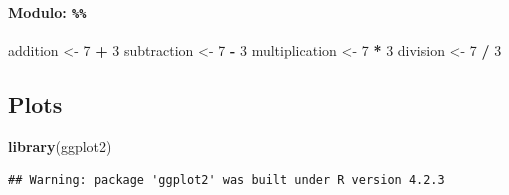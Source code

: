\documentclass[
]{article}
\newenvironment{Shaded}{\begin{snugshade}}{\end{snugshade}}
\newcommand{\CommentTok}[1]{\textcolor[rgb]{0.56,0.35,0.01}{\textit{#1}}}
\newcommand{\DataTypeTok}[1]{\textcolor[rgb]{0.13,0.29,0.53}{#1}}
\newcommand{\DecValTok}[1]{\textcolor[rgb]{0.00,0.00,0.81}{#1}}
\newcommand{\KeywordTok}[1]{\textcolor[rgb]{0.13,0.29,0.53}{\textbf{#1}}}
\newcommand{\NormalTok}[1]{#1}
\newcommand{\OperatorTok}[1]{\textcolor[rgb]{0.81,0.36,0.00}{\textbf{#1}}}
\newcommand{\StringTok}[1]{\textcolor[rgb]{0.31,0.60,0.02}{#1}}
\let\oldparagraph\paragraph
\renewcommand{\paragraph}[1]{\oldparagraph{#1}\mbox{}}
\begin{document}
\hypertarget{modulo}{%
\paragraph{\texorpdfstring{\textbf{Modulo}:
\texttt{\%\%}}{Modulo: \%\%}}\label{modulo}}

\begin{Shaded}
\begin{Highlighting}[]
\NormalTok{addition <-}\StringTok{ }\DecValTok{7} \OperatorTok{+}\StringTok{ }\DecValTok{3}
\NormalTok{subtraction <-}\StringTok{ }\DecValTok{7} \OperatorTok{-}\StringTok{ }\DecValTok{3}
\NormalTok{multiplication <-}\StringTok{ }\DecValTok{7} \OperatorTok{*}\StringTok{ }\DecValTok{3}
\NormalTok{division <-}\StringTok{ }\DecValTok{7} \OperatorTok{/}\StringTok{ }\DecValTok{3}
\end{Highlighting}
\end{Shaded}

\hypertarget{plots}{%
\subsection{Plots}\label{plots}}

\begin{Shaded}
\begin{Highlighting}[]
\KeywordTok{library}\NormalTok{(ggplot2)}
\end{Highlighting}
\end{Shaded}

\begin{verbatim}
## Warning: package 'ggplot2' was built under R version 4.2.3
\end{verbatim}

\begin{Shaded}
\end{Shaded}
\end{document}

